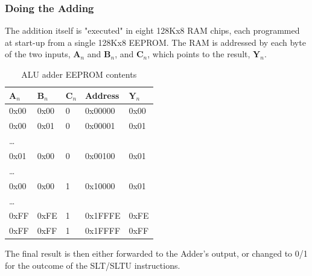 \documentclass[a4paper, 11pt]{article}
\begin{document}
            \subsubsection{Doing the Adding}\label{sec:ALU:Adder:Adding}

                The addition itself is "executed" in eight 128Kx8 RAM chips, each
                programmed at start-up from a single 128Kx8 EEPROM. The RAM is
                addressed by each byte of the two inputs,
                \(\mathbf{A}_{n}\) and \(\mathbf{B}_{n}\), and \(\mathbf{C}_{n}\),
                which points to the result, \(\mathbf{Y}_n\).

                \begin{table}[htb]
                    \centering
                    \caption{ALU adder EEPROM contents}
                    \label{sec:ALU:Adder:Structure:ramTab}
                    \begin{tabularx}{\linewidth}{X X X X X}
                        \addlinespace
                        \toprule
                        \(\mathbf{A}_n\)  &\(\mathbf{B}_n\) &\(\mathbf{C}_n\)   &Address  &\(\mathbf{Y}_n\) \\
                        \midrule
                        \addlinespace

                        0x00    &0x00   &0  &0x00000    &0x00   \\
                        0x00    &0x01   &0  &0x00001    &0x01   \\
                        \dots   &       &   &           &       \\
                        0x01    &0x00   &0  &0x00100    &0x01   \\
                        \dots   &       &   &           &       \\
                        0x00    &0x00   &1  &0x10000    &0x01   \\
                        \dots   &       &   &           &       \\
                        0xFF    &0xFE   &1  &0x1FFFE    &0xFE   \\
                        0xFF    &0xFF   &1  &0x1FFFF    &0xFF   \\

                        \bottomrule
                    \end{tabularx}
                \end{table}

                The final result is then either forwarded to the Adder's output, or
                changed to 0/1 for the outcome of the SLT/SLTU instructions.
\end{document}
